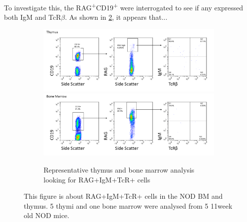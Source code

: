 To investigate this, the RAG\textsuperscript{+}CD19\textsuperscript{+} were interrogated to see if any expressed both IgM and TcR$\beta$.
As shown in \cref{fig:RAGIgMTcRpos}, it appears that...

\begin{figure}
	\begin{subfigure}{\textwidth}
	\includegraphics[width=\textwidth]{Figures/Thy3RAGIgMTcR.png}
	\includegraphics[width=\textwidth]{Figures/BMRAGIgMTcR.png}
	\caption{Representative thymus and bone marrow analysis looking for RAG+IgM+TcR+ cells}
	\label{subfig:BMvThyRAGIgMTcR}
	\end{subfigure}
\caption{This figure is about RAG+IgM+TcR+ cells in the NOD BM and thymus. 5 thymi and one bone marrow were analysed from 5 11week old NOD mice.}
\label{fig:RAGIgMTcRpos}
\end{figure}








